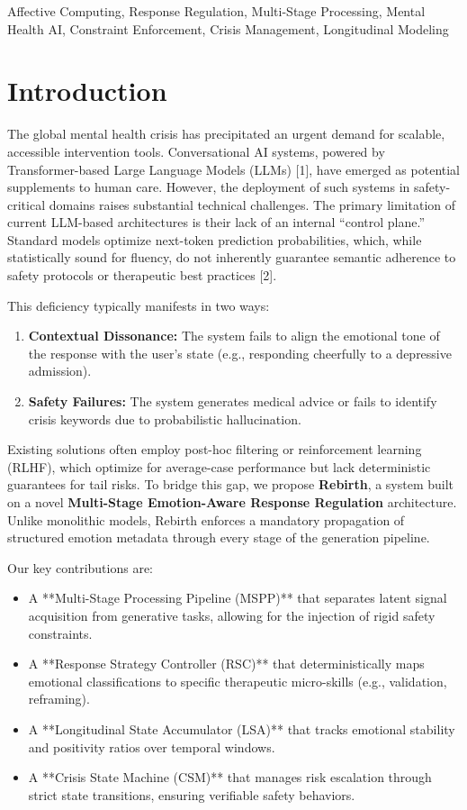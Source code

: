 \documentclass[conference]{IEEEtran}
\begin{document}
\begin{IEEEkeywords}
Affective Computing, Response Regulation, Multi-Stage Processing, Mental Health AI, Constraint Enforcement, Crisis Management, Longitudinal Modeling
\end{IEEEkeywords}

\section{Introduction}
The global mental health crisis has precipitated an urgent demand for scalable, accessible intervention tools. Conversational AI systems, powered by Transformer-based Large Language Models (LLMs) [1], have emerged as potential supplements to human care. However, the deployment of such systems in safety-critical domains raises substantial technical challenges. The primary limitation of current LLM-based architectures is their lack of an internal ``control plane.'' Standard models optimize next-token prediction probabilities, which, while statistically sound for fluency, do not inherently guarantee semantic adherence to safety protocols or therapeutic best practices [2].

This deficiency typically manifests in two ways:
\begin{enumerate}
    \item \textbf{Contextual Dissonance:} The system fails to align the emotional tone of the response with the user's state (e.g., responding cheerfully to a depressive admission).
    \item \textbf{Safety Failures:} The system generates medical advice or fails to identify crisis keywords due to probabilistic hallucination.
\end{enumerate}

Existing solutions often employ post-hoc filtering or reinforcement learning (RLHF), which optimize for average-case performance but lack deterministic guarantees for tail risks. To bridge this gap, we propose \textbf{Rebirth}, a system built on a novel \textbf{Multi-Stage Emotion-Aware Response Regulation} architecture. Unlike monolithic models, Rebirth enforces a mandatory propagation of structured emotion metadata through every stage of the generation pipeline.

Our key contributions are:
\begin{itemize}
    \item A **Multi-Stage Processing Pipeline (MSPP)** that separates latent signal acquisition from generative tasks, allowing for the injection of rigid safety constraints.
    \item A **Response Strategy Controller (RSC)** that deterministically maps emotional classifications to specific therapeutic micro-skills (e.g., validation, reframing).
    \item A **Longitudinal State Accumulator (LSA)** that tracks emotional stability and positivity ratios over temporal windows.
    \item A **Crisis State Machine (CSM)** that manages risk escalation through strict state transitions, ensuring verifiable safety behaviors.
\end{itemize}
\end{document}
